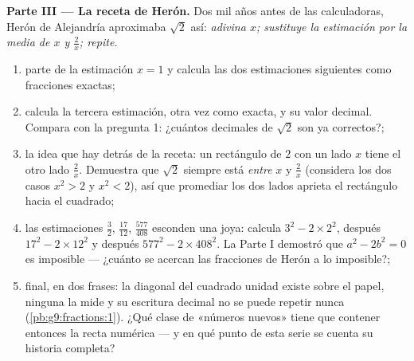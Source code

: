 \begin{problem}
\medskip
\noindent\textbf{Parte III --- La receta de Herón.}
Dos mil años antes de las calculadoras, Herón de Alejandría
aproximaba $\sqrt2$ así: \emph{adivina $x$; sustituye la
estimación por la media de $x$ y $\frac2x$; repite.}
\begin{enumerate}[resume]
  \item parte de la estimación $x = 1$ y calcula las dos estimaciones
        siguientes como fracciones exactas;
  \item calcula la tercera estimación, otra vez como  exacta, y
        su valor decimal. Compara con la pregunta 1: ¿cuántos
        decimales de $\sqrt2$ son ya correctos?;
  \item la idea que hay detrás de la receta: un rectángulo de  $2$ con
        un lado $x$ tiene el otro lado $\frac2x$. Demuestra que
        $\sqrt2$ siempre está \emph{entre} $x$ y $\frac2x$
        (considera los dos casos $x^2 > 2$ y $x^2 < 2$), así que
        promediar los dos lados aprieta el rectángulo hacia
        el cuadrado;
  \item las estimaciones $\frac32$, $\frac{17}{12}$,
        $\frac{577}{408}$ esconden una joya: calcula $3^2 - 2 \times
        2^2$, después $17^2 - 2 \times 12^2$ y después
        $577^2 - 2 \times 408^2$. La Parte I demostró que
        $a^2 - 2b^2 = 0$ es imposible --- ¿cuánto se acercan las
        fracciones de Herón a lo imposible?;
  \item final, en dos frases: la diagonal del cuadrado unidad
        existe sobre el papel, ninguna  la mide y su
        escritura decimal no se puede repetir nunca
        (\cref{pb:g9:fractions:1}). ¿Qué clase de «números nuevos»
        tiene que contener entonces la recta numérica --- y en qué punto de
        esta serie se cuenta su historia completa?
\end{enumerate}
\end{problem}
